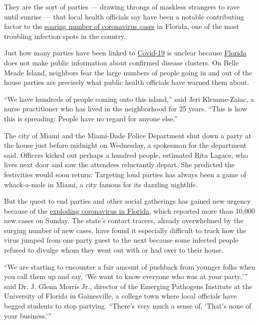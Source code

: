 They are the sort of parties --- drawing throngs of maskless strangers
to rave until sunrise --- that local health officials say have been a
notable contributing factor to the
\href{https://www.nytimes3xbfgragh.onion/2020/06/28/us/coronavirus-florida-miami.html}{soaring
number of coronavirus cases} in Florida, one of the most troubling
infection spots in the country.

Just how many parties have been linked to
\href{https://www.nytimes3xbfgragh.onion/2020/07/20/us/coronavirus-florida-elderly.html}{Covid-19}
is unclear because
\href{https://www.nytimes3xbfgragh.onion/2020/07/20/us/coronavirus-florida-elderly.html}{Florida}
does not make public information about confirmed disease clusters. On
Belle Meade Island, neighbors fear the large numbers of people going in
and out of the house parties are precisely what public health officials
have warned them about.

``We have hundreds of people coming onto this island,'' said Jeri
Klemme-Zaiac, a nurse practitioner who has lived in the neighborhood for
25 years. ``This is how this is spreading: People have no regard for
anyone else.''

The city of Miami and the Miami-Dade Police Department shut down a party
at the house just before midnight on Wednesday, a spokesman for the
department said. Officers kicked out perhaps a hundred people, estimated
Rita Lagace, who lives next door and saw the attendees reluctantly
depart. She predicted the festivities would soon return: Targeting loud
parties has always been a game of whack-a-mole in Miami, a city famous
for its dazzling nightlife.

But the quest to end parties and other social gatherings has gained new
urgency because of the
\href{https://www.nytimes3xbfgragh.onion/2020/06/26/us/coronavirus-florida-texas-bars-closing.html}{exploding
coronavirus in Florida}, which reported more than 10,000 new cases on
Sunday. The state's contact tracers, already overwhelmed by the surging
number of new cases, have found it especially difficult to track how the
virus jumped from one party guest to the next because some infected
people refused to divulge whom they went out with or had over to their
house.

``We are starting to encounter a fair amount of pushback from younger
folks when you call them up and say, `We want to know everyone who was
at your party,''' said Dr. J. Glenn Morris Jr., director of the Emerging
Pathogens Institute at the University of Florida in Gainesville, a
college town where local officials have begged students to stop
partying. ``There's very much a sense of, `That's none of your
business.'''

